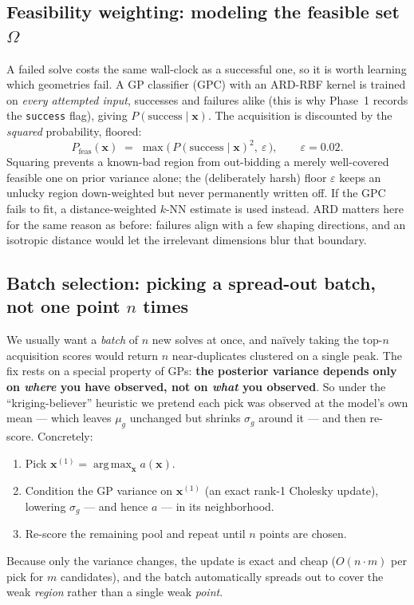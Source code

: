 \documentclass[11pt]{article}
\newcommand{\bx}{\mathbf{x}}
\DeclareMathOperator*{\argmax}{arg\,max}
\begin{document}
\subsection{Feasibility weighting: modeling the feasible set $\Omega$}
\label{sec:feas}
A failed solve costs the same wall-clock as a successful one, so it is worth learning which
geometries fail. A GP classifier (GPC) with an ARD-RBF kernel is trained on \emph{every attempted
input}, successes and failures alike (this is why Phase~1 records the \texttt{success} flag),
giving $P(\text{success}\mid\bx)$. The acquisition is discounted by the \emph{squared} probability,
floored:
\begin{equation}
P_{\text{feas}}(\bx) \;=\; \max\!\Big(\,P(\text{success}\mid\bx)^2,\ \varepsilon\,\Big),\qquad \varepsilon=0.02 .
\end{equation}
Squaring prevents a known-bad region from out-bidding a merely well-covered feasible one on prior
variance alone; the (deliberately harsh) floor $\varepsilon$ keeps an unlucky region down-weighted
but never permanently written off. If the GPC fails to fit, a distance-weighted $k$-NN estimate is
used instead. ARD matters here for the same reason as before: failures align with a few shaping
directions, and an isotropic distance would let the irrelevant dimensions blur that boundary.

\subsection{Batch selection: picking a spread-out batch, not one point $n$ times}
We usually want a \emph{batch} of $n$ new solves at once, and na\"ively taking the top-$n$
acquisition scores would return $n$ near-duplicates clustered on a single peak. The fix rests on a
special property of GPs: \textbf{the posterior variance depends only on \emph{where} you have
observed, not on \emph{what} you observed}. So under the ``kriging-believer'' heuristic we pretend
each pick was observed at the model's own mean --- which leaves $\mu_g$ unchanged but shrinks
$\sigma_g$ around it --- and then re-score. Concretely:
\begin{enumerate}[leftmargin=*]
  \item Pick $\bx^{(1)}=\argmax_{\bx} a(\bx)$.
  \item Condition the GP variance on $\bx^{(1)}$ (an exact rank-1 Cholesky update), lowering
  $\sigma_g$ --- and hence $a$ --- in its neighborhood.
  \item Re-score the remaining pool and repeat until $n$ points are chosen.
\end{enumerate}
Because only the variance changes, the update is exact and cheap ($O(n\cdot m)$ per pick for $m$
candidates), and the batch automatically spreads out to cover the weak \emph{region} rather than a
single weak \emph{point}.
\end{document}
